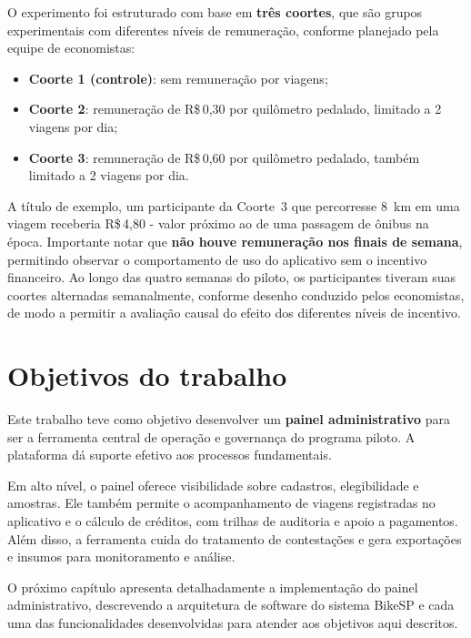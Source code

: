 O experimento foi estruturado com base em \textbf{três coortes}, que são grupos experimentais com diferentes níveis de
remuneração, conforme planejado pela equipe de economistas:
\begin{itemize}
  \item \textbf{Coorte 1 (controle)}: sem remuneração por viagens;
  \item \textbf{Coorte 2}: remuneração de R\$\,0,30 por quilômetro pedalado,
        limitado a 2 viagens por dia;
  \item \textbf{Coorte 3}: remuneração de R\$\,0,60 por quilômetro pedalado,
        também limitado a 2 viagens por dia.
\end{itemize}
A título de exemplo, um participante da Coorte~3 que percorresse 8~km em uma
viagem receberia R\$\,4,80 - valor próximo ao de uma passagem de ônibus na
época. Importante notar que \textbf{não houve remuneração nos finais de semana},
permitindo observar o comportamento de uso do aplicativo sem o incentivo
financeiro. Ao longo das quatro semanas do piloto, os participantes tiveram suas
coortes alternadas semanalmente, conforme desenho conduzido pelos economistas,
de modo a permitir a avaliação causal do efeito dos diferentes níveis de
incentivo.


\section{Objetivos do trabalho}
\label{sec:objetivos-trabalho}
Este trabalho teve como objetivo desenvolver um \textbf{painel administrativo} para ser a ferramenta central de operação e governança do programa piloto. A plataforma dá suporte efetivo aos processos fundamentais.

Em alto nível, o painel oferece visibilidade sobre cadastros, elegibilidade e amostras. Ele também permite o acompanhamento de viagens registradas no aplicativo e o cálculo de créditos, com trilhas de auditoria e apoio a pagamentos. Além disso, a ferramenta cuida do tratamento de contestações e gera exportações e insumos para monitoramento e análise.

O próximo capítulo apresenta detalhadamente a implementação do painel administrativo, descrevendo a arquitetura de software do sistema BikeSP e cada uma das funcionalidades desenvolvidas para atender aos objetivos aqui descritos.


